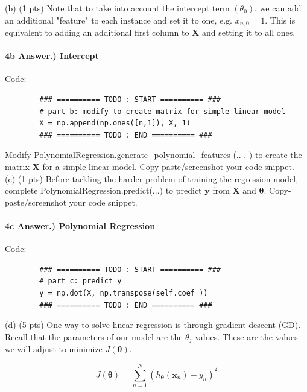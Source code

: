\documentclass[10pt]{article}
\begin{document}
(b) (1 pts) Note that to take into account the intercept term $\left(\theta_{0}\right)$, we can add an additional "feature" to each instance and set it to one, e.g. $x_{n, 0}=1$. This is equivalent to adding an additional first column to $\boldsymbol{X}$ and setting it to all ones.

\paragraph{4b Answer.) Intercept}
\hspace{1cm}

Code: \\
\begin{verbatim}
        ### ========== TODO : START ========== ###
        # part b: modify to create matrix for simple linear model
        X = np.append(np.ones([n,1]), X, 1)
        ### ========== TODO : END ========== ###
\end{verbatim}

Modify PolynomialRegression.generate\_polynomial\_features (.. . ) to create the matrix $\boldsymbol{X}$ for a simple linear model. Copy-paste/screenshot your code snippet.\\

(c) (1 pts) Before tackling the harder problem of training the regression model, complete PolynomialRegression.predict(...) to predict $\boldsymbol{y}$ from $\boldsymbol{X}$ and $\boldsymbol{\theta}$. Copy-paste/screenshot your code snippet.


\paragraph{4c Answer.) Polynomial Regression}
\hspace{1cm}

Code: \\
\begin{verbatim}
        ### ========== TODO : START ========== ###
        # part c: predict y
        y = np.dot(X, np.transpose(self.coef_))
        ### ========== TODO : END ========== ###
\end{verbatim}

(d) (5 pts) One way to solve linear regression is through gradient descent (GD).
Recall that the parameters of our model are the $\theta_{j}$ values. These are the values we will adjust to minimize $J(\boldsymbol{\theta})$.

$$
J(\boldsymbol{\theta})=\sum_{n=1}^{N}\left(h_{\boldsymbol{\theta}}\left(\boldsymbol{x}_{n}\right)-y_{n}\right)^{2}
$$
\end{document}

